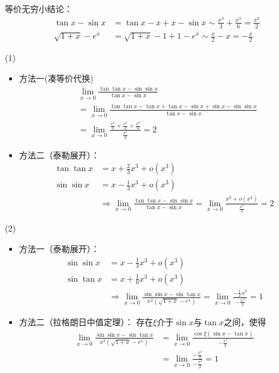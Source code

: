 \documentclass[12pt, a4paper, oneside, UTF8]{ctexbook}
\begin{document}
\begin{solution}
等价无穷小结论：
\begin{align*}
\tan x - \sin x &= \tan x - x + x - \sin x \sim \frac{x^{3}}{3} + \frac{x^{3}}{6} = \frac{x^{3}}{2} \\
\sqrt{1+x} - e^{x} &= \sqrt{1+x} - 1 + 1 - e^{x} \sim \frac{x}{2} - x = -\frac{x}{2}
\end{align*}

\item[(1)]
\begin{itemize}
\item 方法一(凑等价代换)
\begin{align*}
&\lim_{x\to 0}\frac{\tan\tan x - \sin\sin x}{\tan x - \sin x} \\
&= \lim_{x\to 0}\frac{\tan\tan x - \tan x + \tan x - \sin x + \sin x - \sin\sin x}{\tan x - \sin x} \\
&= \lim_{x\to 0}\frac{\frac{x^{3}}{3} + \frac{x^{3}}{2} + \frac{x^{3}}{6}}{\frac{x^{3}}{2}} = 2
\end{align*}

\item 方法二（泰勒展开）：
\begin{align*}
\tan\tan x &= x + \frac{2}{3}x^{3} + o(x^{3}) \\
\sin\sin x &= x - \frac{1}{3}x^{3} + o(x^{3}) \\
&\Rightarrow \lim_{x\to 0}\frac{\tan\tan x - \sin\sin x}{\tan x - \sin x} = \lim_{x\to 0}\frac{x^{3} + o(x^{3})}{\frac{x^{3}}{2}} = 2
\end{align*}
\end{itemize}

\item[(2)]
\begin{itemize}
\item 方法一（泰勒展开）：
\begin{align*}
\sin\sin x &= x - \frac{1}{3}x^{3} + o(x^{3}) \\
\sin\tan x &= x + \frac{1}{6}x^{3} + o(x^{3}) \\
&\Rightarrow \lim_{x\to 0}\frac{\sin\sin x - \sin\tan x}{x^{2}(\sqrt{1+x}-e^{x})} = \lim_{x\to 0}\frac{-\frac{1}{2}x^{3}}{-\frac{x^{3}}{2}} = 1
\end{align*}

\item 方法二（拉格朗日中值定理）：
存在$\xi$介于$\sin x$与$\tan x$之间，使得
\begin{align*}
\lim_{x\to 0}\frac{\sin\sin x - \sin\tan x}{x^{2}(\sqrt{1+x}-e^{x})} &= \lim_{x\to 0}\frac{\cos\xi(\sin x - \tan x)}{-\frac{x^{3}}{2}} \\
&= \lim_{x\to 0}\frac{-\frac{x^{3}}{2}}{-\frac{x^{3}}{2}} = 1
\end{align*}
\end{itemize}


\end{solution}
\end{document}

